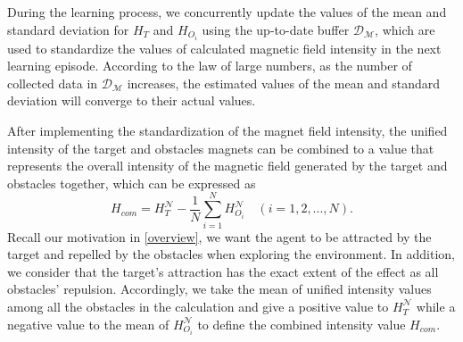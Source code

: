 \documentclass[journal]{IEEEtran}
\begin{document}
During the learning process, we concurrently update the values of the mean and standard deviation for $H_{T}$ and $H_{O_i}$ using the up-to-date buffer $\mathcal{D}_\mathcal{M}$, which are used to standardize the values of calculated magnetic field intensity in the next learning episode.
According to the law of large numbers, as the number of collected data in $\mathcal{D}_\mathcal{M}$ increases, the estimated values of the mean and standard deviation will converge to their actual values.


After implementing the standardization of the magnet field intensity, the unified intensity of the target and obstacles magnets can be combined to a value that represents the overall intensity of the magnetic field generated by the target and obstacles together, which can be expressed as
\begin{equation}
    H_{com} = H_{T}^{\mathcal{N}} - \frac{1}{N}\sum_{i=1}^{N} H_{O_i}^{\mathcal{N}} \quad (i=1,2,...,N).
\label{H_com}
\end{equation}
Recall our motivation in \ref{overview}, we want the agent to be attracted by the target and repelled by the obstacles when exploring the environment.
In addition, we consider that the target's attraction has the exact extent of the effect as all obstacles' repulsion.
Accordingly, we take the mean of unified intensity values among all the obstacles in the calculation and give a positive value to $H_{T}^{\mathcal{N}}$ while a negative value to the mean of $H_{O_i}^{\mathcal{N}}$ to define the combined intensity value $H_{com}$.
\end{document}
